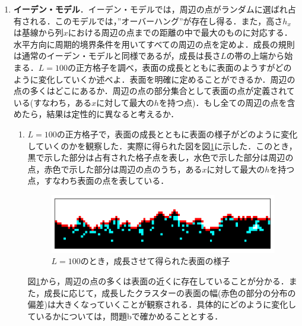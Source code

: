 \documentclass{jsarticle}
\begin{document}
    \begin{enumerate}
        \renewcommand{\labelenumi}{\alph{enumi}.}
        \renewcommand{\labelenumii}{}
        
        \item \textbf{イーデン・モデル}．イーデン・モデルでは，周辺の点がランダムに選ばれ占有される．このモデルでは，”オーバーハング”が存在し得る．また，高さ$h_{x}$は基線から列$x$における周辺の点までの距離の中で最大のものに対応する．水平方向に周期的境界条件を用いてすべての周辺の点を定めよ．成長の規則は通常のイーデン・モデルと同様であるが，成長は長さ$L$の帯の上端から始まる．$L=100$の正方格子を調べ，表面の成長とともに表面のようすがどのように変化していくか述べよ．表面を明確に定めることができるか．周辺の点の多くはどこにあるか．周辺の点の部分集合として表面の点が定義されている(すなわち，ある$x$に対して最大の$h$を持つ点)．もし全ての周辺の点を含めたら，結果は定性的に異なると考えるか．
            \begin{enumerate}
                \item $L=100$の正方格子で，表面の成長とともに表面の様子がどのように変化していくのかを観察した．実際に得られた図を図\ref{fig:14-12-f1}に示した．このとき，黒で示した部分は占有された格子点を表し，水色で示した部分は周辺の点，赤色で示した部分は周辺の点のうち，ある$x$に対して最大の$h$を持つ点，すなわち表面の点を表している．
                
                \begin{figure}[H]
                    \begin{center}
                        \includegraphics[width=10.0cm]{figure_1.pdf}
                        \caption{$L=100$のとき，成長させて得られた表面の様子}
                        \label{fig:14-12-f1}
                    \end{center}
                \end{figure}
                図\ref{fig:14-12-f1}から，周辺の点の多くは表面の近くに存在していることが分かる．また，成長に応じて，成長したクラスターの表面の幅(赤色の部分の分布の偏差)は大きくなっていくことが観察される．具体的にどのように変化しているかについては，問題bで確かめることとする．
            \end{enumerate}
        

\end{enumerate}
\end{document}

